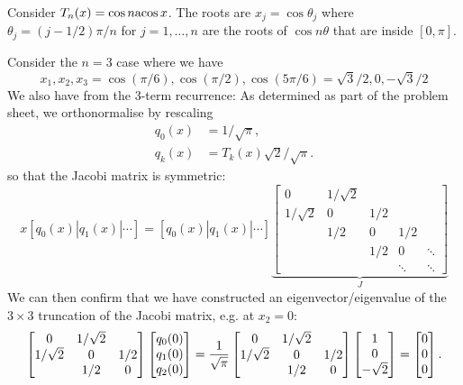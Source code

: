 \begin{example} Consider $T_n(x) = \cos n {\rm acos}\, x$. The roots  are $x_j = \cos \ensuremath{\theta}_j$ where $\ensuremath{\theta}_j = (j-1/2)\ensuremath{\pi}/n$ for $j = 1,\ensuremath{\ldots},n$ are the roots of $\cos n \ensuremath{\theta}$ that are inside $[0,\ensuremath{\pi}]$. 

Consider the $n = 3$ case where we have
\[
x_1,x_2,x_3 = \cos(\ensuremath{\pi}/6),\cos(\ensuremath{\pi}/2),\cos(5\ensuremath{\pi}/6) = \sqrt{3}/2,0,-\sqrt{3}/2
\]
We also have from the 3-term recurrence:
As determined as part of the problem sheet, we orthonormalise by rescaling
\begin{align*}
q_0(x) &= 1/\sqrt{\ensuremath{\pi}}, \\
q_k(x) &= T_k(x) \sqrt{2}/\sqrt{\ensuremath{\pi}}.
\end{align*}
so that the Jacobi matrix is symmetric:
\[
x [q_0(x)|q_1(x)|\ensuremath{\cdots}] = [q_0(x)|q_1(x)|\ensuremath{\cdots}] \underbrace{\begin{bmatrix} 0 & 1/\sqrt{2} \\
                            1/\sqrt{2} & 0 & 1/2 \\
                            &1/2 & 0 & 1/2 \\
                             &   & 1/2 & 0 & \ensuremath{\ddots} \\
                              &  && \ensuremath{\ddots} & \ensuremath{\ddots}
\end{bmatrix}}_J
\]
We can then confirm that we have constructed an eigenvector/eigenvalue of the $3 \ensuremath{\times} 3$ truncation of the Jacobi matrix, e.g. at $x_2 = 0$:
\[
\begin{bmatrix} 
0 & 1/\sqrt{2} \\
1/\sqrt{2} & 0 & 1/2 \\
    & 1/2 & 0\end{bmatrix} \begin{bmatrix} q_0(0) \\ q_1(0) \\ q_2(0) 
    \end{bmatrix} = {1 \over \sqrt \ensuremath{\pi}} \begin{bmatrix} 
0 & 1/\sqrt{2} \\
1/\sqrt{2} & 0 & 1/2 \\
    & 1/2 & 0\end{bmatrix} \begin{bmatrix} 1 \\ 0 \\ -{\sqrt{2}}
    \end{bmatrix} =\begin{bmatrix} 0 \\ 0 \\ 0
    \end{bmatrix}.
\]
\end{example}

